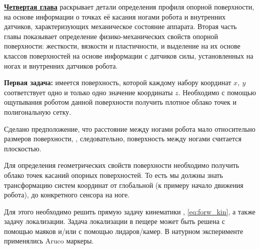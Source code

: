 
\textbf{\underline{Четвертая глава}} раскрывает детали определения профиля опорной поверхности, на основе информации о точках её касания ногами робота и внутренних датчиков, характеризующих механическое состояние аппарата. Вторая часть главы показывает определение физико-механических свойств опорной поверхности:
жесткости, вязкости и пластичности, и выделение на их основе классов поверхностей на основе информации с датчиков силы, установленных на ногах и внутренних датчиков робота.

\textbf{Первая задача:} имеется поверхность, которой каждому набору координат $x,\ y$ соответствует одно и только одно значение координаты $z$. Необходимо с помощью ощупывания роботом данной поверхности получить плотное облако точек и полигональную сетку. 

Сделано предположение, что расстояние между ногами робота мало относительно размеров поверхности, , следовательно, поверхность между ногами считается плоскостью.

Для определения геометрических свойств поверхности необходимо получить облако точек касаний опорных поверхностей. То есть мы должны знать трансформацию систем координат от глобальной (к примеру начало движения робота), до конкретного сенсора на ноге. 

Для этого необходимо решить прямую задачу кинематики , \eqref{eq:forw_kin}, а также задачу локализации. Задача локализации в пещере может быть решена с помощью маяков и/или с помощью лидаров/камер. В натурном эксперименте применялись Aruco маркеры.


